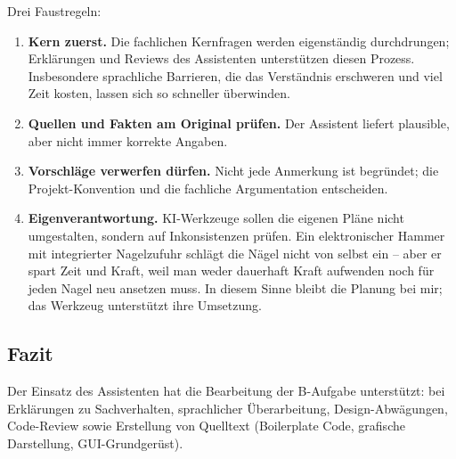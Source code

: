 Drei Faustregeln:

\begin{enumerate}
    \item \textbf{Kern zuerst.} Die fachlichen Kernfragen werden eigenständig durchdrungen; Erklärungen und Reviews des Assistenten unterstützen diesen Prozess. Insbesondere sprachliche Barrieren, die das Verständnis erschweren und viel Zeit kosten, lassen sich so schneller überwinden.
    \item \textbf{Quellen und Fakten am Original prüfen.} Der Assistent liefert plausible, aber nicht immer korrekte Angaben.
    \item \textbf{Vorschläge verwerfen dürfen.} Nicht jede Anmerkung ist begründet; die Projekt-Konvention und die fachliche Argumentation entscheiden.
    \item \textbf{Eigenverantwortung.} \acs{KI}-Werkzeuge sollen die eigenen Pläne nicht umgestalten, sondern auf Inkonsistenzen prüfen. Ein elektronischer Hammer mit integrierter Nagelzufuhr schlägt die Nägel nicht von selbst ein -- aber er spart Zeit und Kraft, weil man weder dauerhaft Kraft aufwenden noch für jeden Nagel neu ansetzen muss. In diesem Sinne bleibt die Planung bei mir; das Werkzeug unterstützt ihre Umsetzung.
\end{enumerate}

\subsection{Fazit}

Der Einsatz des Assistenten hat die Bearbeitung der B-Aufgabe unterstützt: bei Erklärungen zu Sachverhalten, sprachlicher Überarbeitung, Design-Abwägungen, Code-Review sowie Erstellung von Quelltext (Boilerplate Code, grafische Darstellung, \acs{GUI}-Grundgerüst).

